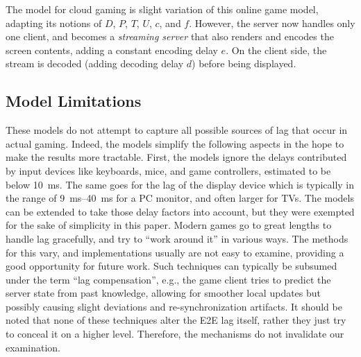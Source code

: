 The model for cloud gaming is slight variation of this online game model, adapting its notions of $D$, $P$, $T$, $U$, $c$, and $f$. However, the server now handles only one client, and becomes a \textit{streaming server} that also renders and encodes the screen contents, adding a constant encoding delay $e$. On the client side, the stream is decoded (adding decoding delay $d$) before being displayed.


\subsection{Model Limitations}

These models do not attempt to capture all possible sources of lag that occur in actual gaming. Indeed, the models simplify the following aspects in the hope to make the results more tractable. First, the models ignore the delays contributed by input devices like keyboards, mice, and game controllers, estimated to be below \SI{10}{\milli\second}. The same goes for the lag of the display device which is typically in the range of \SIrange{9}{40}{\milli\second} for a PC monitor, and often larger for TVs. The models can be extended to take those delay factors into account, but they were exempted for the sake of simplicity in this paper. Modern games go to great lengths to handle lag gracefully, and try to ``work around it'' in various ways. The methods for this vary, and implementations usually are not easy to examine, providing a good opportunity for future work. Such techniques can typically be subsumed under the term ``lag compensation'', e.g., the game client tries to predict the server state from past knowledge, allowing for smoother local updates but possibly causing slight deviations and re-synchronization artifacts. %
It should be noted that none of these techniques alter the \gls{E2E} lag itself, rather they just try to conceal it on a higher level. Therefore, the mechanisms do not invalidate our examination.



